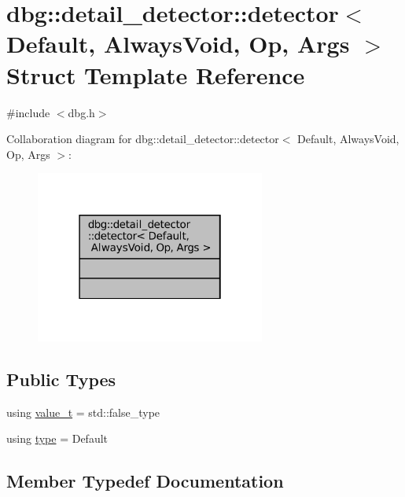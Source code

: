 \hypertarget{structdbg_1_1detail__detector_1_1detector}{}\section{dbg\+:\+:detail\+\_\+detector\+:\+:detector$<$ Default, Always\+Void, Op, Args $>$ Struct Template Reference}
\label{structdbg_1_1detail__detector_1_1detector}


{\ttfamily \#include $<$dbg.\+h$>$}



Collaboration diagram for dbg\+:\+:detail\+\_\+detector\+:\+:detector$<$ Default, Always\+Void, Op, Args $>$\+:
\nopagebreak
\begin{figure}[H]
\begin{center}
\leavevmode
\includegraphics[width=214pt]{structdbg_1_1detail__detector_1_1detector__coll__graph}
\end{center}
\end{figure}
\subsection*{Public Types}
\begin{DoxyCompactItemize}
\item 
using \hyperlink{structdbg_1_1detail__detector_1_1detector_af1b6da4282d723669e926c52f446a989}{value\+\_\+t} = std\+::false\+\_\+type
\item 
using \hyperlink{structdbg_1_1detail__detector_1_1detector_aab6b446944545683b9533ea8fc623480}{type} = Default
\end{DoxyCompactItemize}


\subsection{Member Typedef Documentation}
\mbox{\label{structdbg_1_1detail__detector_1_1detector_aab6b446944545683b9533ea8fc623480}} 
